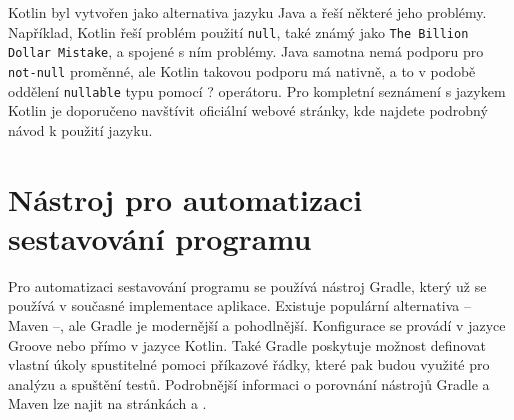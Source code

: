     Kotlin byl vytvořen jako alternativa jazyku Java a řeší některé jeho problémy. Například, Kotlin řeší problém použití \texttt{null}, také známý jako \texttt{The Billion Dollar Mistake}, a spojené s ním problémy. Java samotna nemá podporu pro \texttt{not-null} proměnné, ale Kotlin takovou podporu má nativně, a to v podobě oddělení \texttt{nullable} typu pomocí ? operátoru. Pro kompletní seznámení s jazykem Kotlin je doporučeno navštívit oficiální webové stránky, kde najdete podrobný návod k použití jazyku.\cite{kotlin-documentation}
    
    
    

\section{Nástroj pro automatizaci sestavování programu}\label{resere:build}
    Pro automatizaci sestavování programu se používá nástroj Gradle, který už se používá v současné implementace aplikace. Existuje populární alternativa -- Maven --, ale Gradle je modernější a pohodlnější. Konfigurace se provádí v jazyce Groove nebo přímo v jazyce Kotlin. Také Gradle poskytuje možnost definovat vlastní úkoly spustitelné pomoci příkazové řádky, které pak budou využité pro analýzu a spuštění testů. Podrobnější informaci o porovnání nástrojů Gradle a Maven lze najit na stránkách \cite{grale-vs-mavem} a \cite{gradle-vs-maven-bealdung}.

